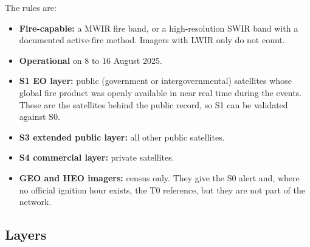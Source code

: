 \documentclass[11pt]{article}
\begin{document}
The rules are:
\begin{itemize}[leftmargin=1.2cm]
    \item \textbf{Fire-capable:} a MWIR fire band, or a high-resolution SWIR band with a documented active-fire method. Imagers with LWIR only do not count.
    \item \textbf{Operational} on 8 to 16 August 2025.
    \item \textbf{S1 EO layer:} public (government or intergovernmental) satellites whose global fire product was openly available in near real time during the events. These are the satellites behind the public record, so S1 can be validated against S0.
    \item \textbf{S3 extended public layer:} all other public satellites.
    \item \textbf{S4 commercial layer:} private satellites.
    \item \textbf{GEO and HEO imagers:} census only. They give the S0 alert and, where no official ignition hour exists, the T0 reference, but they are not part of the network.
\end{itemize}

\subsection{Layers}
\end{document}
